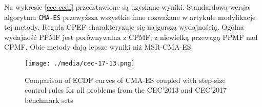 Na wykresie \ref{cec-ecdf} przedstawione są uzyskane wyniki. Standardowa wersja algorytmu \texttt{CMA-ES} przewyższa wszystkie inne
rozważane w artykule modyfikacje tej metody. Reguła CPEF charakteryzuje się najgorszą wydajnością. Ogólna wydajność PPMF jest porównywalna z CPMF, z niewielką przewagą PPMF nad CPMF. Obie metody dają lepsze wyniki niż MSR-CMA-ES.

\begin{figure}[ht]
\begin{centering}
\texttt{[image: ./media/cec-17-13.png]}
\end{centering}
\caption{Comparison of ECDF curves of CMA-ES coupled with step-size control rules for all problems from the CEC'2013 and CEC'2017 benchmark sets}
\label{fig13-17}
\end{figure}


